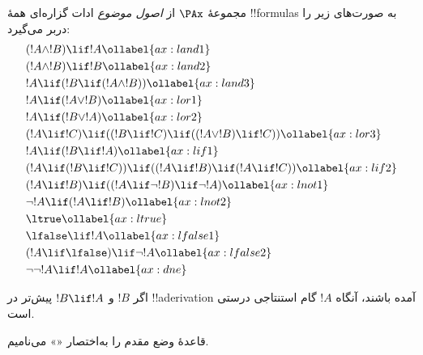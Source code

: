 \documentclass[../../../include/open-logic-section]{subfiles}
\begin{document}
      {}
      {}


\begin{defn}
مجموعهٔ $\PAx$ از \emph{اصول موضوع} ادات گزاره‌ای همهٔ !!{formula}s
به صورت‌های زیر را دربر می‌گیرد:
\begin{align}
  & (!A \land !B) \lif !A \ollabel{ax:land1}\\
  & (!A \land !B) \lif !B \ollabel{ax:land2}\\
  & !A \lif (!B \lif (!A \land !B)) \ollabel{ax:land3}\\
  & !A \lif (!A \lor !B) \ollabel{ax:lor1}\\
  & !A \lif (!B \lor !A) \ollabel{ax:lor2}\\
  & (!A \lif !C) \lif ((!B \lif !C) \lif ((!A \lor !B) \lif !C)) \ollabel{ax:lor3}\\
  & !A \lif (!B \lif !A) \ollabel{ax:lif1}\\
  & (!A \lif (!B \lif !C)) \lif ((!A \lif !B) \lif (!A \lif !C)) \ollabel{ax:lif2}\\
  & (!A \lif !B) \lif ((!A \lif \lnot !B) \lif \lnot !A) \ollabel{ax:lnot1}\\
  & \lnot !A \lif (!A \lif !B) \ollabel{ax:lnot2}\\
  & \ltrue \ollabel{ax:ltrue}\\
  & \lfalse \lif !A \ollabel{ax:lfalse1}\\
  & (!A \lif \lfalse) \lif \lnot !A \ollabel{ax:lfalse2}\\
  & \lnot\lnot !A \lif !A \ollabel{ax:dne}
\end{align}
\end{defn}

\begin{defn}
  اگر $!B$ و $!B \lif !A$ پیش‌تر در !!a{derivation} آمده باشند، آنگاه
  $!A$ گام استنتاجی درستی است.
\end{defn}

قاعدهٔ وضع مقدم را به‌اختصار «\MP» می‌نامیم.
\end{document}
